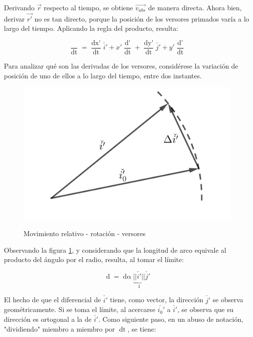 \documentclass{article}
\begin{document}
Derivando $\overrightarrow{r}$ respecto al tiempo, se obtiene $\overrightarrow{v_{abs}}$ de manera directa. Ahora bien, derivar $\overrightarrow{r'}$ no es tan directo, porque la posición de los versores primados varía a lo largo del tiempo. Aplicando la regla del producto, resulta:

\begin{equation}
\frac{ \mathop{ \overrightarrow{dr'} } }{ \mathop{dt} } = \frac{ \mathop{dx'} }{ \mathop{dt} } \check{i'} + x' \frac{ \mathop{d\check{i}'} }{ \mathop{dt} } + \frac{ \mathop{dy'} }{ \mathop{dt} } \check{j'} + y' \frac{ \mathop{d\check{j}'} }{ \mathop{dt} }
\end{equation}

Para analizar qué son las derivadas de los versores, considérese la variación de posición de uno de ellos a lo largo del tiempo, entre dos instantes.

\begin{figure}[ht]
\centering
\caption{Movimiento relativo - rotación - versores}
\includegraphics[scale=1.3]{../../common/img/62.01/theory/05-kinematics-rel-mov-rot-dv.png}
\label{fig:relMovRotDv}
\end{figure}

Observando la figura \ref{fig:relMovRotDv}, y considerando que la longitud de arco equivale al producto del ángulo por el radio, resulta, al tomar el límite:

\begin{equation}
\mathop{ d\check{i'} } = \mathop{ d\alpha } \underbrace{ ||\check{i'}|| }_{1} \check{j'}
\end{equation}

El hecho de que el diferencial de $\check{i'}$ tiene, como vector, la dirección $\check{j'}$ se observa geométricamente. Si se toma el límite, al acercarse $\check{i_0'}$ a $\check{i'}$, se observa que su dirección es ortogonal a la de $\check{i'}$. Como siguiente paso, en un abuso de notación, "dividiendo" miembro a miembro por $\mathop{dt}$, se tiene:
\end{document}
